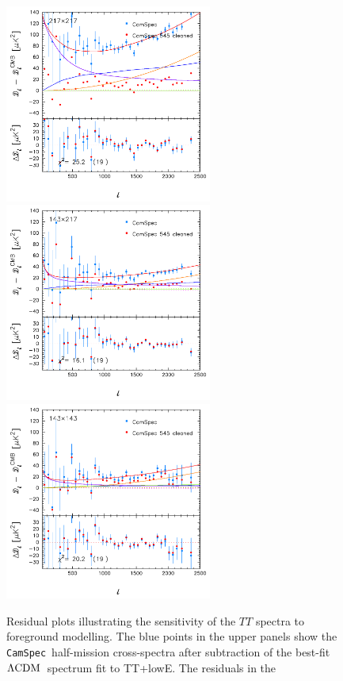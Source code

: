 \documentclass[longauth,traditabstract]{aa}
\newcommand{\camspec}{{\tt CamSpec}}
\newcommand{\mksym}[1]{\ifmmode {\rm #1}\else #1\fi}
\newcommand{\dataplus}{\allowbreak+}
\newcommand{\TT}{\mksym{TT}}
\newcommand{\lowE}{\mksym{lowE}}
\newcommand{\shortTT}{\TT\dataplus\lowE}
\providecommand{\LCDM}{{$\rm{\Lambda CDM}$}}
\begin{document}
\begin{figure}
\begin{center}
\includegraphics[height=65mm,angle=0]{217x217_cleaned.pdf}\hspace*{-2mm}
\includegraphics[height=65mm,angle=0]{143x217_cleaned_cropped.pdf}\hspace*{-2mm}
\includegraphics[height=65mm,angle=0]{143x143_cleaned_cropped.pdf}
\end{center}
\vspace{-3mm}
\caption {Residual plots illustrating the sensitivity of the $TT$ spectra to foreground modelling.
The blue points in the upper panels show the \camspec\ half-mission cross-spectra
after subtraction of the best-fit \LCDM\ spectrum fit to \shortTT.  The residuals in the
}
\end{figure}
\end{document}
